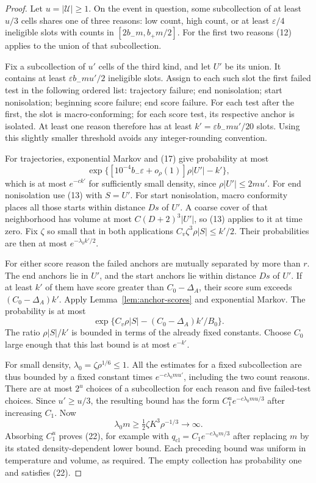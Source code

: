 \begin{proof}
Let $u=|\mathcal U|\geq1$. On the event in question, some
subcollection of at least $u/3$ cells shares one of three
reasons: low count, high count, or at least
$\varepsilon/4$ ineligible slots with counts in
$[2b_-m,b_+m/2]$. For the first two reasons (12) applies
to the union of that subcollection.

Fix a subcollection of $u'$ cells of the third kind, and let
$U'$ be its union. It contains at least
$\varepsilon b_-mu'/2$ ineligible slots. Assign to each such
slot the first failed test in the following ordered list:
trajectory failure; end nonisolation; start nonisolation;
beginning score failure; end score failure. For each test
after the first, the slot is macro-conforming; for each score
test, its respective anchor is isolated. At least one reason
therefore has at least
$k'=\varepsilon b_-mu'/20$ slots. Using this slightly smaller
threshold avoids any integer-rounding convention.

For trajectories, exponential Markov and (17) give probability
at most
\[
 \exp\{[10^{-4}b_-\varepsilon+o_\rho(1)]\rho|U'|-k'\},
\]
which is at most $e^{-ck'}$ for sufficiently small density,
since $\rho|U'|\leq2mu'$.
For end nonisolation use (13) with $S=U'$.
For start nonisolation, macro conformity places all those starts
within distance $Ds$ of $U'$. A coarse cover of that neighborhood
has volume at most $C(D+2)^3|U'|$, so (13) applies to it at
time zero. Fix $\zeta$ so small that in both applications
$C_v\zeta^3\rho|S|\leq k'/2$.
Their probabilities are then at most $e^{-\lambda_0 k'/2}$.

For either score reason the failed anchors are mutually separated
by more than $r$. The end anchors lie in $U'$, and the start
anchors lie within distance $Ds$ of $U'$. If at least $k'$
of them have score greater than $C_0-\Delta_A$, their score
sum exceeds $(C_0-\Delta_A)k'$. Apply
Lemma~\ref{lem:anchor-scores} and exponential Markov. The
probability is at most
\[
 \exp\{C_v\rho|S|-(C_0-\Delta_A)k'/B_0\}.
\]
The ratio $\rho|S|/k'$ is bounded in terms of the already
fixed constants. Choose $C_0$ large enough that this last
bound is at most $e^{-k'}$.

For small density, $\lambda_0=\zeta\rho^{1/6}\leq1$.
All the estimates for a fixed subcollection are thus bounded
by a fixed constant times $e^{-c\lambda_0mu'}$, including
the two count reasons. There are at most $2^u$ choices of
a subcollection for each reason and five failed-test choices.
Since $u'\geq u/3$, the resulting bound has the form
$C_1^u e^{-c\lambda_0mu/3}$ after increasing $C_1$.
Now
\[
 \lambda_0m\geq\tfrac12\zeta K^3\rho^{-1/3}\longrightarrow\infty.
\]
Absorbing $C_1^u$ proves (22), for example with
$q_{\mathrm{cl}}=C_1e^{-c\lambda_0m/3}$ after replacing
$m$ by its stated density-dependent lower bound. Each preceding
bound was uniform in temperature and volume, as required.
The empty collection has probability one and satisfies (22).
\end{proof}

